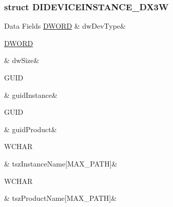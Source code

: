 \subsubsection{struct D\-I\-D\-E\-V\-I\-C\-E\-I\-N\-S\-T\-A\-N\-C\-E\-\_\-\-D\-X3\-W}
\begin{DoxyFields}{Data Fields}
\hypertarget{a00003_a2bdaf065880c5cb7fa08be0bf17027a6}{\hyperlink{a00003_a50e15ae51c87ae06ab29c8148cb5f36c}{D\-W\-O\-R\-D}}\label{a00003_a2bdaf065880c5cb7fa08be0bf17027a6}
&
dw\-Dev\-Type&
\\
\hline

\hypertarget{a00003_a669c5a85f5a9eb97e64ad880fadaaa2d}{\hyperlink{a00003_a50e15ae51c87ae06ab29c8148cb5f36c}{D\-W\-O\-R\-D}}\label{a00003_a669c5a85f5a9eb97e64ad880fadaaa2d}
&
dw\-Size&
\\
\hline

\hypertarget{a00003_a7fba3dbe50344a5643d4b3c3ae186576}{G\-U\-I\-D}\label{a00003_a7fba3dbe50344a5643d4b3c3ae186576}
&
guid\-Instance&
\\
\hline

\hypertarget{a00003_a30bf31754fdd016b11557bf6a75bfc87}{G\-U\-I\-D}\label{a00003_a30bf31754fdd016b11557bf6a75bfc87}
&
guid\-Product&
\\
\hline

\hypertarget{a00003_a5b995e3d8db75f43f25f02007bdfd7d9}{W\-C\-H\-A\-R}\label{a00003_a5b995e3d8db75f43f25f02007bdfd7d9}
&
tsz\-Instance\-Name\mbox{[}M\-A\-X\-\_\-\-P\-A\-T\-H\mbox{]}&
\\
\hline

\hypertarget{a00003_a0f804540b5c2e9c037fca76b898bcff7}{W\-C\-H\-A\-R}\label{a00003_a0f804540b5c2e9c037fca76b898bcff7}
&
tsz\-Product\-Name\mbox{[}M\-A\-X\-\_\-\-P\-A\-T\-H\mbox{]}&
\\
\hline

\end{DoxyFields}
\label{db/db6/a00074}
\hypertarget{a00003_db/db6/a00074}{}
